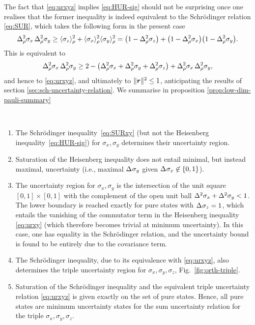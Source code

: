 The fact that \eqref{eq:urxyz} implies \eqref{eq:HUR-sig} should not be surprising once one realises that the former inequality  is indeed equivalent to the Schr\"odinger relation \eqref{eq:SUR}, which takes the following form in the present case
\begin{equation}\label{eq:SURxy}
  \varr{\sigma_x}\,\varr{\sigma_y}\geq \langle\sigma_z\rangle_\rho^2+\langle\sigma_x\rangle_\rho^2\langle\sigma_y\rangle_\rho^2=\bigl(1-\varr{\sigma_z}\bigr)+
  \bigl(1-\varr{\sigma_x}\bigr)\bigl(1-\varr{\sigma_y}\bigr).
\end{equation}
This is equivalent to
\begin{equation}
  \varr{\sigma_x}\,\varr{\sigma_y}\geq 2-\bigl(\varr{\sigma_x}+\varr{\sigma_y}+\varr{\sigma_z} \bigr) +\varr{\sigma_x}\,\varr{\sigma_y},
\end{equation}
and hence to \eqref{eq:urxyz}, and ultimately to $\|\bm{r}\|^2\le 1$, anticipating the results of section \ref{sec:sch-uncertainty-relation}.
We summarise in proposition \ref{prop:low-dim-pauli-summary}
\begin{prop}\label{prop:low-dim-pauli-summary}
~\\
\begin{enumerate}
\item The Schr{\"o}dinger inequality~\eqref{eq:SURxy} (but not the Heisenberg inequality~\eqref{eq:HUR-sig}) for $\sigma_x,\sigma_y$ determines their uncertainty region.
  
\item Saturation of the Heisenberg inequality does not entail minimal, but instead maximal, uncertainty  (i.e., maximal $\sdev{\sigma_y}$ given $\sdev{\sigma_x}\not\in\{0,1\}$).

\item The uncertainty region for $\sigma_x,\sigma_y$ is the intersection of the unit square $[0,1]\times[0,1]$ with the complement of the open unit ball $\var{\sigma_x}+\var{\sigma_y}< 1$. The lower boundary is reached exactly for pure states with $\sdev{\sigma_z}=1$, which entails the vanishing of the commutator term in the Heisenberg inequality \eqref{eq:urxy} (which therefore becomes trivial at minimum uncertainty). In this case, one has equality in the Schr\"odinger relation, and the uncertainty bound is found to be entirely due to the covariance term.
  
\item The Schr\"odinger inequality, due to its equivalence with \eqref{eq:urxyz}, also determines the triple uncertainty region for $\sigma_x,\sigma_y,\sigma_z$, Fig.~\ref{fig:orth-triple}. 
  
\item Saturation of the Schr\"odinger inequality and  the equivalent triple uncertainty relation \eqref{eq:urxyz} is given exactly on the set of pure states. Hence, all pure states are minimum uncertainty states for the sum uncertainty relation for the triple $\sigma_x,\sigma_y,\sigma_z$.
\end{enumerate}
\end{prop}
